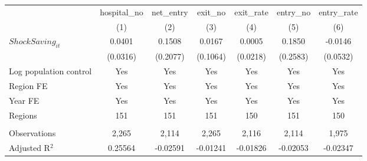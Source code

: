 \begingroup
\centering
\begin{tabular}{lcccccc}
   \toprule
                          & hospital\_no  & net\_entry  & exit\_no  & exit\_rate  & entry\_no  & entry\_rate \\    
                          & (1)           & (2)         & (3)       & (4)         & (5)        & (6)\\  
   \midrule 
   $ShockSaving_{it}$     & 0.0401        & 0.1508      & 0.0167    & 0.0005      & 0.1850     & -0.0146\\   
                          & (0.0316)      & (0.2077)    & (0.1064)  & (0.0218)    & (0.2583)   & (0.0532)\\   
   Log population control & Yes           & Yes         & Yes       & Yes         & Yes        & Yes\\  
   Region FE              & Yes           & Yes         & Yes       & Yes         & Yes        & Yes\\  
   Year FE                & Yes           & Yes         & Yes       & Yes         & Yes        & Yes\\  
   Regions                & 151           & 151         & 151       & 150         & 151        & 150\\  
    \\
   Observations           & 2,265         & 2,114       & 2,265     & 2,116       & 2,114      & 1,975\\  
   Adjusted R$^2$         & 0.25564       & -0.02591    & -0.01241  & -0.01826    & -0.02053   & -0.02347\\  
   \bottomrule
\end{tabular}
\par\endgroup
